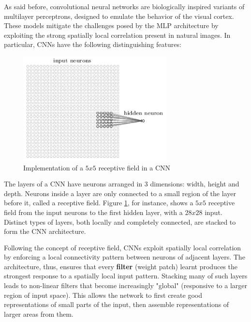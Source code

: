 As said before, convolutional neural networks are biologically inspired variants of multilayer perceptrons, designed to emulate the behavior of the visual cortex. These models mitigate the challenges posed by the \ac{MLP} architecture by exploiting the strong spatially local correlation present in natural images.
In particular, \acsp{CNN} have the following distinguishing features:

\begin{description}
	
	\begin{figure}
		\centering
		\includegraphics[width=0.7\textwidth]{Images/receptive_field}
		\caption{Implementation of a $5x5$ receptive field in a \acs{CNN}}\label{fig:receptive_field}
	\end{figure}
	
	\item[3D volumes of neurons] The layers of a \acs{CNN} have neurons arranged in 3 dimensions: width, height and depth. Neurons inside a layer are only connected to a small region of the layer before it, called a receptive field. Figure \ref{fig:receptive_field}, for instance, shows a $5x5$ receptive field from the input neurons to the first hidden layer, with a $28x28$ input. Distinct types of layers, both locally and completely connected, are stacked to form the \acs{CNN} architecture.
	
	\item[Local connectivity] Following the concept of receptive field, \acsp{CNN} exploit spatially local correlation by enforcing a local connectivity pattern between neurons of adjacent layers. The architecture, thus, ensures that every \textbf{filter} (\ie weight patch) learnt produces the strongest response to a spatially local input pattern. Stacking many of such layers leads to non-linear filters that become increasingly "global" (\ie responsive to a larger region of input space). This allows the network to first create good representations of small parts of the input, then assemble representations of larger areas from them.
	

\end{description}
